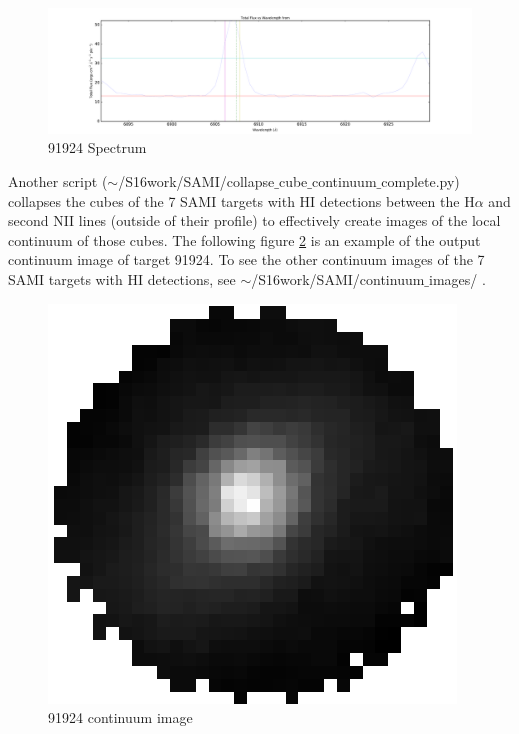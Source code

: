 \documentclass[10pt,letterpaper]{article}
\begin{document}
\begin{figure}[h!]
\center
\caption{91924 Spectrum}\label{fig: 91924 Spectrum}
\includegraphics[scale=0.4]{figures/91924_red_7_Y13SAR1_P014_15T029fitscollapsed.pdf}
\end{figure}

\newpage

Another script ($\sim$/S16work/SAMI/collapse$\_$cube$\_$continuum$\_$complete.py) collapses the cubes of the 7 SAMI targets with HI detections between the H$\alpha$ and second NII lines (outside of their profile) to effectively create images of the local continuum of those cubes. The following figure \ref{fig: 91924 continuum image} is an example of the output continuum image of target 91924. To see the other continuum images of the 7 SAMI targets with HI detections, see $\sim$/S16work/SAMI/continuum$\_$images/ .

\begin{figure}[h!]
\center
\caption{91924 continuum image}\label{fig: 91924 continuum image}
\includegraphics[scale=0.4]{figures/91924_continuum_image.png}
\end{figure}
\end{document}
